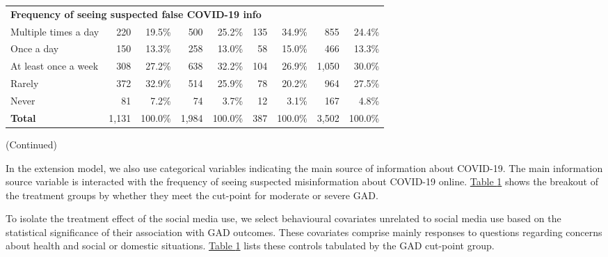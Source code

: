 \documentclass{article}[12pt]
\begin{document}
\begin{table}[b!]
\begin{threeparttable}
\begin{tabular}{lrrrrrrrr}
                \hline
                \multicolumn{8}{l}{\textbf{Frequency of seeing suspected false COVID-19 info}} \\
                Multiple times a day&220&19.5\%&500&25.2\%&135&34.9\%&855&24.4\% \\
                Once a day&150&13.3\%&258&13.0\%&58&15.0\%&466&13.3\% \\
                At least once a week&308&27.2\%&638&32.2\%&104&26.9\%&1,050&30.0\% \\
                Rarely&372&32.9\%&514&25.9\%&78&20.2\%&964&27.5\% \\
                Never&81&7.2\%&74&3.7\%&12&3.1\%&167&4.8\% \\
                \textbf{Total}&1,131&100.0\%&1,984&100.0\%&387&100.0\%&3,502&100.0\% \\
                \hline
            \end{tabular}
            
            \begin{flushright}
                (Continued)
            \end{flushright}
            
            \label{tab:behav1}
            
        \end{threeparttable}
        \end{table}
        
        In the extension model, we also use categorical variables indicating the main source of information about COVID-19. The main information source variable is interacted with the frequency of seeing suspected misinformation about COVID-19 online. \hyperref[tab:behav1]{Table \ref*{tab:behav1}} shows the breakout of the treatment groups by whether they meet the cut-point for moderate or severe GAD.
        
        To isolate the treatment effect of the social media use, we select behavioural covariates unrelated to social media use based on the statistical significance of their association with GAD outcomes. These covariates comprise mainly responses to questions regarding concerns about health and social or domestic situations.  \hyperref[tab:behav2]{Table \ref*{tab:behav1}} lists these controls tabulated by the GAD cut-point group.
        
\end{document}
